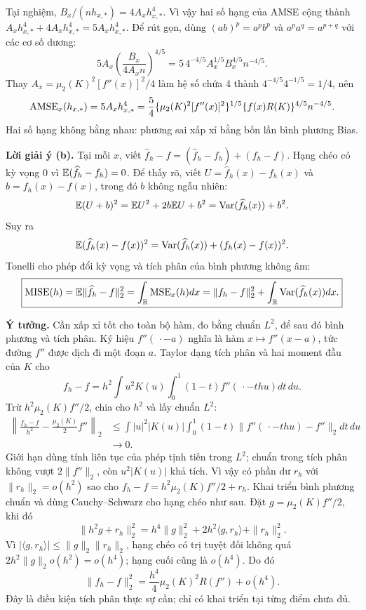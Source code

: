 Tại nghiệm, $B_x/(nh_{x,*})=4A_xh_{x,*}^4$. Vì vậy
hai số hạng của AMSE cộng thành $A_xh_{x,*}^4+4A_xh_{x,*}^4=5A_xh_{x,*}^4$.
Để rút gọn, dùng $(ab)^p=a^pb^p$ và $a^pa^q=a^{p+q}$ với các cơ số dương:
\[
5A_x\left(\frac{B_x}{4A_xn}\right)^{4/5}
=5\,4^{-4/5}A_x^{1/5}B_x^{4/5}n^{-4/5}.
\]
Thay $A_x=\mu_2(K)^2[f''(x)]^2/4$ làm hệ số chứa 4 thành
$4^{-4/5}4^{-1/5}=1/4$, nên
\[
\operatorname{AMSE}_x(h_{x,*})=5A_xh_{x,*}^4
=\frac54\{\mu_2(K)^2[f''(x)]^2\}^{1/5}
\{f(x)R(K)\}^{4/5}n^{-4/5}.
\]
Hai số hạng không bằng nhau: phương sai xấp xỉ bằng bốn lần bình phương Bias.

\textbf{Lời giải ý (b).}
Tại mỗi $x$, viết
$\widehat f_h-f=(\widehat f_h-f_h)+(f_h-f)$.
Hạng chéo có kỳ vọng 0 vì $\mathbb E(\widehat f_h-f_h)=0$.
Để thấy rõ, viết $U=\widehat f_h(x)-f_h(x)$ và $b=f_h(x)-f(x)$,
trong đó $b$ không ngẫu nhiên:
\[
\mathbb E(U+b)^2=\mathbb E U^2+2b\mathbb E U+b^2=\operatorname{Var}(\widehat f_h(x))+b^2.
\]
Suy ra
\[
\mathbb E(\widehat f_h(x)-f(x))^2
=\operatorname{Var}(\widehat f_h(x))+(f_h(x)-f(x))^2.
\]
Tonelli cho phép đổi kỳ vọng và tích phân của bình phương không âm:
\[
\boxed{\operatorname{MISE}(h)=\mathbb E\|\widehat f_h-f\|_2^2
=\int_{\mathbb R}\operatorname{MSE}_x(h)dx
=\|f_h-f\|_2^2+\int_{\mathbb R}\operatorname{Var}(\widehat f_h(x))dx.}
\]

\textbf{Ý tưởng.} Cần xấp xỉ tốt cho toàn bộ hàm, đo bằng chuẩn $L^2$,
để sau đó bình phương và tích phân. Ký hiệu $f''(\,\cdot-a)$ nghĩa là
hàm $x\mapsto f''(x-a)$, tức đường $f''$ được dịch đi một đoạn $a$.
Taylor dạng tích phân và hai moment đầu của $K$ cho
\[
f_h-f=h^2\int u^2K(u)\int_0^1(1-t)f''(\,\cdot-thu)dt\,du.
\]
Trừ $h^2\mu_2(K)f''/2$, chia cho $h^2$ và lấy chuẩn $L^2$:
\begin{align*}
\left\|\frac{f_h-f}{h^2}-\frac{\mu_2(K)}2f''\right\|_2
&\leq\int |u|^2|K(u)|\int_0^1(1-t)
\|f''(\,\cdot-thu)-f''\|_2dt\,du\\
&\longrightarrow0.
\end{align*}
Giới hạn dùng tính liên tục của phép tịnh tiến trong $L^2$;
chuẩn trong tích phân không vượt $2\|f''\|_2$, còn $u^2|K(u)|$ khả tích.
Vì vậy có phần dư $r_h$ với $\|r_h\|_2=o(h^2)$ sao cho
$f_h-f=h^2\mu_2(K)f''/2+r_h$. Khai triển bình phương chuẩn và dùng
Cauchy--Schwarz cho hạng chéo như sau.
Đặt $g=\mu_2(K)f''/2$, khi đó
\[
\|h^2g+r_h\|_2^2=h^4\|g\|_2^2+2h^2\langle g,r_h\rangle+\|r_h\|_2^2.
\]
Vì $|\langle g,r_h\rangle|\leq\|g\|_2\|r_h\|_2$,
hạng chéo có trị tuyệt đối không quá $2h^2\|g\|_2o(h^2)=o(h^4)$;
hạng cuối cũng là $o(h^4)$. Do đó
\[
\|f_h-f\|_2^2=\frac{h^4}{4}\mu_2(K)^2R(f'')+o(h^4).
\]
Đây là điều kiện tích phân thực sự cần; chỉ có khai triển tại từng điểm chưa đủ.

